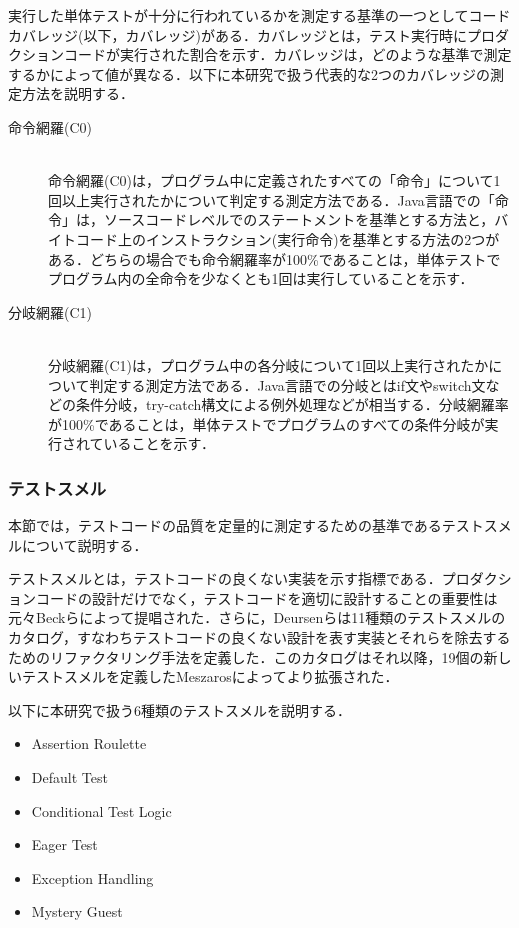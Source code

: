 \documentclass[12pt]{jarticle} %
\begin{document}
実行した単体テストが十分に行われているかを測定する基準の一つとしてコードカバレッジ(以下，カバレッジ)がある．カバレッジとは，テスト実行時にプロダクションコードが実行された割合を示す．カバレッジは，どのような基準で測定するかによって値が異なる．以下に本研究で扱う代表的な2つのカバレッジの測定方法を説明する．

\begin{description}
\item[命令網羅(C0)]~\\
命令網羅(C0)は，プログラム中に定義されたすべての「命令」について1回以上実行されたかについて判定する測定方法である．Java言語での「命令」は，ソースコードレベルでのステートメントを基準とする方法と，バイトコード上のインストラクション(実行命令)を基準とする方法の2つがある．どちらの場合でも命令網羅率が100\%であることは，単体テストでプログラム内の全命令を少なくとも1回は実行していることを示す．
\item[分岐網羅(C1)]~\\
分岐網羅(C1)は，プログラム中の各分岐について1回以上実行されたかについて判定する測定方法である．Java言語での分岐とはif文やswitch文などの条件分岐，try-catch構文による例外処理などが相当する．分岐網羅率が100\%であることは，単体テストでプログラムのすべての条件分岐が実行されていることを示す．
\end{description}




\subsubsection{テストスメル}

本節では，テストコードの品質を定量的に測定するための基準であるテストスメルについて説明する．

テストスメルとは，テストコードの良くない実装を示す指標である．プロダクションコードの設計だけでなく，テストコードを適切に設計することの重要性は元々Beckら\cite{h1}によって提唱された．さらに，Deursenら\cite{t1}は11種類のテストスメルのカタログ，すなわちテストコードの良くない設計を表す実装とそれらを除去するためのリファクタリング手法を定義した．このカタログはそれ以降，19個の新しいテストスメルを定義したMeszaros\cite{b6}によってより拡張された．

以下に本研究で扱う6種類のテストスメルを説明する．

\begin{itemize}
\item Assertion Roulette
\item Default Test
\item Conditional Test Logic
\item Eager Test
\item Exception Handling
\item Mystery Guest
\end{itemize}
\end{document}
